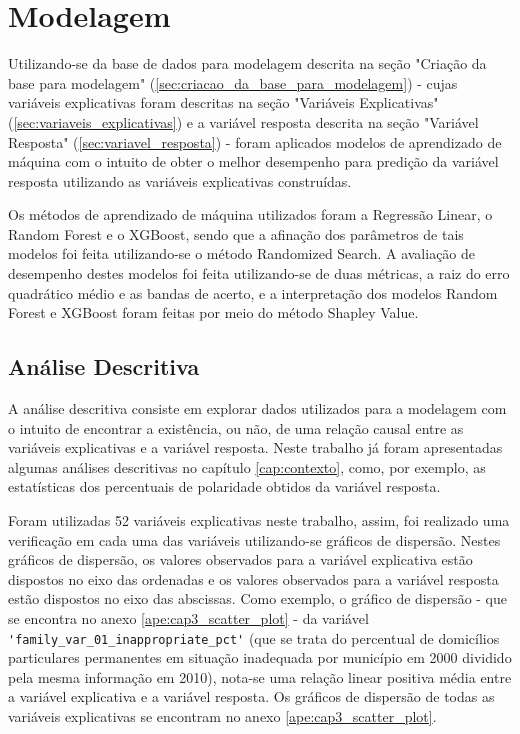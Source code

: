 \chapter{Modelagem}
\label{cap:modelagem}

Utilizando-se da base de dados para modelagem descrita na seção "Criação da base para modelagem" (\ref{sec:criacao_da_base_para_modelagem}) - cujas variáveis explicativas foram descritas na seção "Variáveis Explicativas" (\ref{sec:variaveis_explicativas}) e a variável resposta descrita na seção "Variável Resposta" (\ref{sec:variavel_resposta}) - foram aplicados modelos de aprendizado de máquina com o intuito de obter o melhor desempenho para predição da variável resposta utilizando as variáveis explicativas construídas.

Os métodos de aprendizado de máquina utilizados foram a Regressão Linear, o Random Forest e o XGBoost, sendo que a afinação dos parâmetros de tais modelos foi feita utilizando-se o método Randomized Search. A avaliação de desempenho destes modelos foi feita utilizando-se de duas métricas, a raiz do erro quadrático médio e as bandas de acerto, e a interpretação dos modelos Random Forest e XGBoost foram feitas por meio do método Shapley Value.

\section{Análise Descritiva}
\label{sec:analise_descritiva}

A análise descritiva consiste em explorar dados utilizados para a modelagem com o intuito de encontrar a existência, ou não, de uma relação causal entre as variáveis explicativas e a variável resposta. Neste trabalho já foram apresentadas algumas análises descritivas no capítulo \ref{cap:contexto}, como, por exemplo, as estatísticas dos percentuais de polaridade obtidos da variável resposta.

Foram utilizadas 52 variáveis explicativas neste trabalho, assim, foi realizado uma verificação em cada uma das variáveis utilizando-se gráficos de dispersão. Nestes gráficos de dispersão, os valores observados para a variável explicativa estão dispostos no eixo das ordenadas e os valores observados para a variável resposta estão dispostos no eixo das abscissas. Como exemplo, o gráfico de dispersão - que se encontra no anexo \ref{ape:cap3_scatter_plot} - da variável \verb|'family_var_01_inappropriate_pct'| (que se trata do percentual de domicílios particulares permanentes em situação inadequada por município em 2000 dividido pela mesma informação em 2010), nota-se uma relação linear positiva média entre a variável explicativa e a variável resposta. Os gráficos de dispersão de todas as variáveis explicativas se encontram no anexo \ref{ape:cap3_scatter_plot}.

